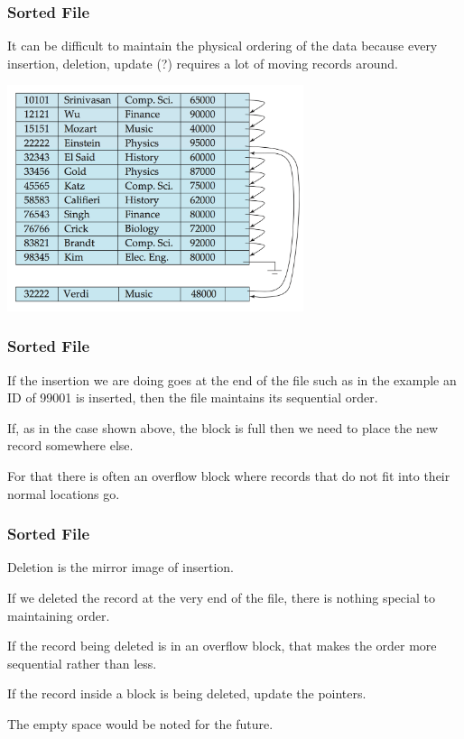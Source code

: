 \begin{frame}
\frametitle{Sorted File}

It can be difficult to maintain the physical ordering of the data because every insertion, deletion, update (?) requires a lot of moving records around. 


\begin{center}
\includegraphics[width=0.65\textwidth]{images/sequential-2}
\end{center}

\end{frame}


\begin{frame}
\frametitle{Sorted File}
If the insertion we are doing goes at the end of the file such as in the example an ID of 99001 is inserted, then the file maintains its sequential order. 

If, as in the case shown above, the block is full then we need to place the new record somewhere else. 

For that there is often an \alert{overflow block} where records that do not fit into their normal locations go. 

\end{frame}



\begin{frame}
\frametitle{Sorted File}

Deletion is the mirror image of insertion. 

If we deleted the record at the very end of the file, there is nothing special to maintaining order. 

If the record being deleted is in an overflow block, that makes the order more sequential rather than less. 

If the record inside a block is being deleted, update the pointers.

The empty space would be noted for the future. 

\end{frame}



